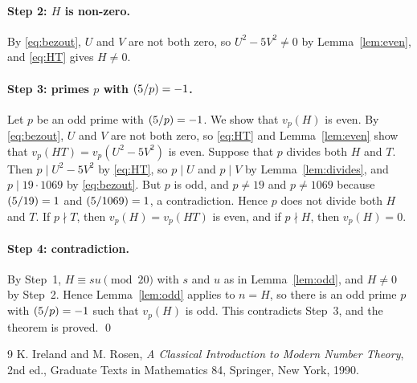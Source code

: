 \documentclass[11pt]{article}
\newcommand{\leg}[2]{\mathchoice{\biggl(\dfrac{#1}{#2}\biggr)}{(#1/#2)}{(#1/#2)}{(#1/#2)}}
\begin{document}
\paragraph{Step 2: $H$ is non-zero.} By \eqref{eq:bezout}, $U$ and $V$ are not both zero, so $U^2-5V^2\neq0$ by Lemma~\ref{lem:even}, and \eqref{eq:HT} gives $H\neq0$.

\paragraph{\texorpdfstring{Step 3: primes $p$ with $\leg{5}{p}=-1$.}{Step 3: inert primes.}} Let $p$ be an odd prime with $\leg{5}{p}=-1$. We show that $v_p(H)$ is even. By \eqref{eq:bezout}, $U$ and $V$ are not both zero, so \eqref{eq:HT} and Lemma~\ref{lem:even} show that $v_p(HT)=v_p(U^2-5V^2)$ is even. Suppose that $p$ divides both $H$ and $T$. Then $p\mid U^2-5V^2$ by \eqref{eq:HT}, so $p\mid U$ and $p\mid V$ by Lemma~\ref{lem:divides}, and $p\mid 19\cdot 1069$ by \eqref{eq:bezout}. But $p$ is odd, and $p\neq19$ and $p\neq1069$ because $\leg{5}{19}=1$ and $\leg{5}{1069}=1$, a contradiction. Hence $p$ does not divide both $H$ and $T$. If $p\nmid T$, then $v_p(H)=v_p(HT)$ is even, and if $p\nmid H$, then $v_p(H)=0$.

\paragraph{Step 4: contradiction.} By Step~1, $H\equiv su\pmod{20}$ with $s$ and $u$ as in Lemma~\ref{lem:odd}, and $H\neq0$ by Step~2. Hence Lemma~\ref{lem:odd} applies to $n=H$, so there is an odd prime $p$ with $\leg{5}{p}=-1$ such that $v_p(H)$ is odd. This contradicts Step~3, and the theorem is proved.
\qed

\begin{thebibliography}{9}
 K. Ireland and M. Rosen, \emph{A Classical Introduction to Modern Number Theory}, 2nd ed., Graduate Texts in Mathematics 84, Springer, New York, 1990.
\end{thebibliography}
\end{document}
